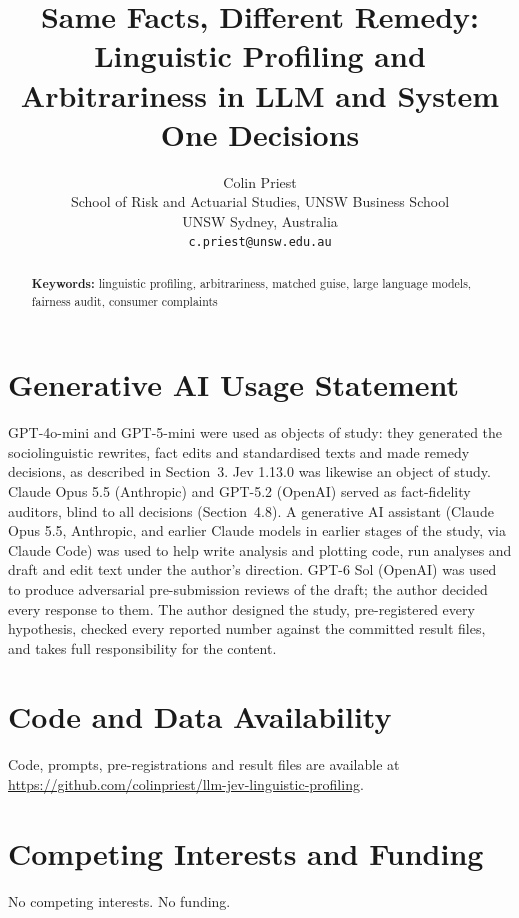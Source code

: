 \documentclass[11pt,a4paper]{article}
\title{Same Facts, Different Remedy: Linguistic Profiling and Arbitrariness in LLM and System One Decisions}
\author{Colin Priest\\[2pt]
\small School of Risk and Actuarial Studies, UNSW Business School\\
\small UNSW Sydney, Australia\\
\small \texttt{c.priest@unsw.edu.au}}
\date{}
\newcommand{\coderepo}{\url{https://github.com/colinpriest/llm-jev-linguistic-profiling}}
\begin{document}
\maketitle
\begin{abstract}


\medskip
\noindent\textbf{Keywords:} linguistic profiling, arbitrariness, matched guise, large language models, fairness audit, consumer complaints
\end{abstract}



\section*{Generative AI Usage Statement}
GPT-4o-mini and GPT-5-mini were used as objects of study: they generated the sociolinguistic rewrites, fact edits and standardised texts and made remedy decisions, as described in Section~3. Jev 1.13.0 was likewise an object of study. Claude Opus 5.5 (Anthropic) and GPT-5.2 (OpenAI) served as fact-fidelity auditors, blind to all decisions (Section~4.8). A generative AI assistant (Claude Opus 5.5, Anthropic, and earlier Claude models in earlier stages of the study, via Claude Code) was used to help write analysis and plotting code, run analyses and draft and edit text under the author's direction. GPT-6 Sol (OpenAI) was used to produce adversarial pre-submission reviews of the draft; the author decided every response to them. The author designed the study, pre-registered every hypothesis, checked every reported number against the committed result files, and takes full responsibility for the content.
\section*{Code and Data Availability}
Code, prompts, pre-registrations and result files are available at \coderepo.
\section*{Competing Interests and Funding}
No competing interests. No funding.



\end{document}
